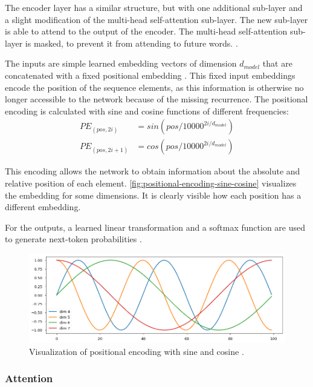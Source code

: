 The encoder layer has a similar structure, but with one additional sub-layer and a slight modification of the multi-head self-attention sub-layer.
The new sub-layer is able to attend to the output of the encoder.
The multi-head self-attention sub-layer is masked, to prevent it from attending to future words. \cite[p.~~3]{1706.03762}.

The inputs are simple learned embedding vectors of dimension $d_{model}$ that are concatenated with a fixed positional embedding \cite[p.~~5--6]{1706.03762}.
This fixed input embeddings encode the position of the sequence elements, as this information is otherwise no longer accessible to the network because of the missing recurrence.
The positional encoding is calculated with sine and cosine functions of different frequencies:
\begin{align*} 
	PE_{(pos,2i)} & = sin(pos/10000^{2i/d_{model}}) \\
	PE_{(pos,2i+1)} & = cos(pos/10000^{2i/d_{model}})
\end{align*}

This encoding allows the network to obtain information about the absolute and relative position of each element.
\autoref{fig:positional-encoding-sine-cosine} visualizes the embedding for some dimensions.
It is clearly visible how each position has a different embedding.

For the outputs, a learned linear transformation and a softmax function are used to generate next-token probabilities \cite[p.~~5]{1706.03762}.

\begin{figure}[h]
\centering
\includegraphics[width=0.7\paperwidth]{figures/positional-encoding-sine-cosine}
\caption[Visualization of positional encoding with sine and cosine]{Visualization of positional encoding with sine and cosine \cite{annotated.transformer}.}
\label{fig:positional-encoding-sine-cosine}
\end{figure}

\subsubsection{Attention}\label{sssec:attention}


